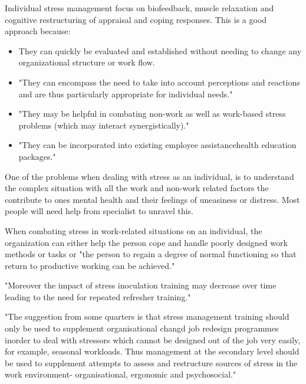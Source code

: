 Individual stress management focus on biofeedback, muscle relaxation and cognitive restructuring of appraisal and coping responses. This is a good approach because:

\begin{itemize}
\item They can quickly be evaluated and established without needing to change any organizational structure or work flow.
\item "They can encompass the need to take into account perceptions and reactions and are thus particularly appropriate for individual needs."
\item "They may be helpful in combating non-work as well as work-based stress problems (which may interact synergistically)."
\item "They can be incorporated into existing employee assistancehealth education packages."
\end{itemize}

One of the problems when dealing with stress as an individual, is to understand the complex situation with all the work and non-work related factors the contribute to ones mental health and their feelings of uneasiness or distress. Most people will need help from specialist to unravel this.

When combating stress in work-related situations on an individual, the organization can either help the person cope and handle poorly designed work methods or tasks or "the person to regain a degree of normal functioning so that return to productive working can be achieved."

"Moreover the impact of stress inoculation training may decrease over time leading to the need for repeated refresher training."

"The suggestion from some quarters is that stress management training should only be used to supplement organisational changd job redesign programmes inorder to deal with stressors which cannot be designed out of the job very easily, for example, seasonal workloads. Thus management at the secondary level should be used to supplement attempts to assess and restructure sources of stress in the work environment- organisational, ergonomic and psychosocial."